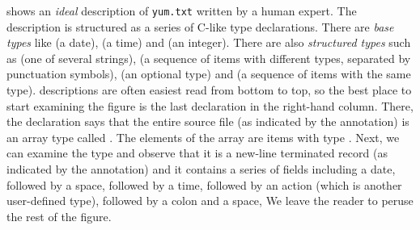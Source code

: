  shows an {\em ideal} \pads{} description of
{\tt yum.txt} written by a human expert.  The description is
structured as a series of C-like type declarations.  There
are {\em base types} like  (a date),
 (a time) and  (an integer).
There are also {\em structured types} such as
 (one of several strings), 
(a sequence of items with different types, 
separated by punctuation symbols),  
(an optional type) and  (a sequence of
items with the same type).  \pads{} descriptions
are often easiest read from bottom to top,
so the best place to start examining the figure
is the last declaration in the right-hand column.
There, the declaration says that the entire
source file (as indicated by the  
annotation) is an array type called .
The elements of the array are items with
type .  Next, we can examine
the type  and observe that it
is a new-line terminated 
record (as indicated by the 
annotation) and it contains a series of fields
including a date, followed by a space, followed
by a time, followed by an action (which is another
user-defined type), followed by a colon and a
space, \etc{} We leave the reader to peruse the
rest of the figure.

